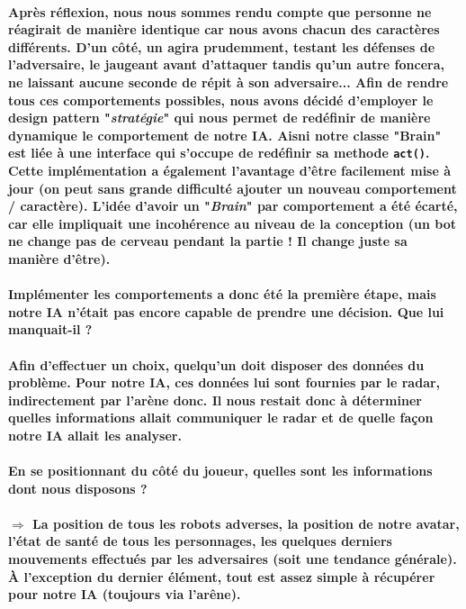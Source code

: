 \paragraph{Après réflexion, nous nous sommes rendu compte que personne ne réagirait de manière identique car nous avons chacun des caractères différents. D'un c\^oté, un agira prudemment, testant les défenses de l'adversaire, le jaugeant avant d'attaquer tandis qu'un autre foncera, ne laissant aucune seconde de répit à son adversaire... Afin de rendre tous ces comportements possibles, nous avons décidé d'employer le design pattern "\textit{stratégie}" qui nous permet de redéfinir de manière dynamique le comportement de notre IA. Aisni notre classe "\textbf{Brain}" est liée à une interface qui s'occupe de redéfinir sa methode \verb?act()?. Cette implémentation a également l'avantage d'être facilement mise à jour (on peut sans grande difficulté ajouter un nouveau comportement / caractère). L'idée d'avoir un "\textit{Brain}" par comportement a été écarté, car elle impliquait une incohérence au niveau de la conception (un bot ne change pas de cerveau pendant la partie ! Il change juste sa manière d'être).}



\paragraph{\textbf{Implémenter les comportements a donc été la première étape, mais notre IA n'était pas encore capable de prendre une décision. Que lui manquait-il ?}}

\paragraph{Afin d'effectuer un choix, quelqu'un doit disposer des données du problème. Pour notre IA, ces données lui sont fournies par le radar, indirectement par l'arène donc. Il nous restait donc à déterminer quelles informations allait communiquer le radar et de quelle façon notre IA allait les analyser.}

\paragraph{En se positionnant du côté du joueur, quelles sont les informations dont nous disposons ?}
\paragraph{$\Longrightarrow$ La position de tous les robots adverses, la position de notre avatar, l'état de santé de tous les personnages, les quelques derniers mouvements effectués par les adversaires (soit une tendance générale). \`A l'exception du dernier élément, tout est assez simple à récupérer pour notre IA (toujours via l'arêne).}

